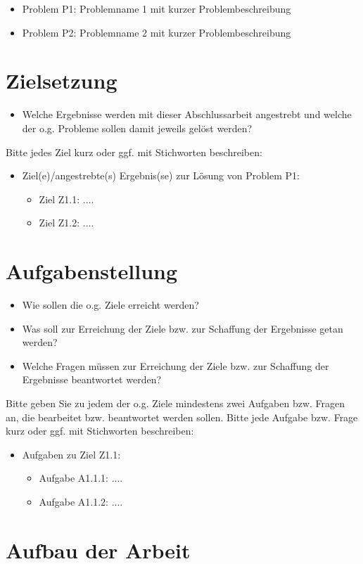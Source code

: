 \begin{itemize}


\item Problem P1: Problemname 1 mit kurzer Problembeschreibung
\item Problem P2: Problemname 2 mit kurzer Problembeschreibung
\end{itemize}

\section{Zielsetzung}

\begin{itemize}
\item Welche Ergebnisse werden mit dieser Abschlussarbeit angestrebt und welche der o.g. Probleme sollen damit jeweils gelöst werden?
\end{itemize}
Bitte jedes Ziel kurz oder ggf. mit Stichworten beschreiben:
\begin{itemize}
\item Ziel(e)/angestrebte(s) Ergebnis(se) zur Lösung von Problem P1:
	\begin{itemize}
	\item Ziel Z1.1: ....
	\item Ziel Z1.2: ....
	\end{itemize}
\end{itemize}

\section{Aufgabenstellung}

\begin{itemize}
\item Wie sollen die o.g. Ziele erreicht werden?
\item Was soll zur Erreichung der Ziele bzw. zur Schaffung der Ergebnisse getan werden?
\item Welche Fragen müssen zur Erreichung der Ziele bzw. zur Schaffung der Ergebnisse beantwortet  werden?
\end{itemize}


Bitte geben Sie zu jedem der o.g. Ziele mindestens zwei Aufgaben bzw. Fragen an, die bearbeitet bzw. beantwortet werden sollen. Bitte jede Aufgabe bzw. Frage kurz oder ggf. mit Stichworten beschreiben:

\begin{itemize}
\item Aufgaben zu Ziel Z1.1:
	\begin{itemize}
	\item Aufgabe A1.1.1: ....
	\item Aufgabe A1.1.2: ....
	\end{itemize}
\end{itemize}

\section{Aufbau der Arbeit}
